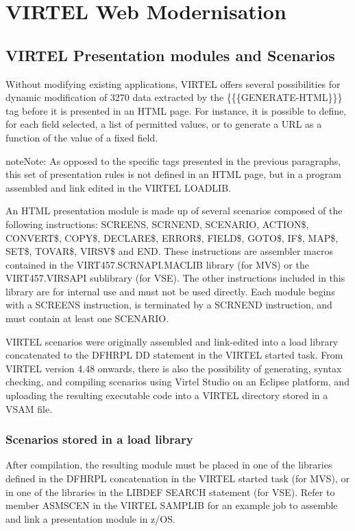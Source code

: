 \documentclass[letterpaper,10pt,english]{sphinxmanual}
\begin{document}
\section{VIRTEL Web Modernisation}
\label{\detokenize{User_Guide:v457ug-virtel-scenarios}}\label{\detokenize{User_Guide:virtel-web-modernisation}}

\subsection{VIRTEL Presentation modules and Scenarios}
\label{\detokenize{User_Guide:virtel-presentation-modules-and-scenarios}}
Without modifying existing applications, VIRTEL offers several possibilities for dynamic modification of 3270 data
extracted by the \{\{\{GENERATE-HTML\}\}\} tag before it is presented in an HTML page. For instance, it is possible to define,
for each field selected, a list of permitted values, or to generate a URL as a function of the value of a fixed field.

\begin{sphinxadmonition}{note}{Note:}
As opposed to the specific tags presented in the previous paragraphs, this set of presentation rules is not defined in an HTML page, but in a program assembled and link edited in the VIRTEL LOADLIB.
\end{sphinxadmonition}

An HTML presentation module is made up of several scenarios composed of the following instructions: SCREENS, SCRNEND, SCENARIO, ACTION\$, CONVERT\$, COPY\$, DECLARE\$, ERROR\$, FIELD\$, GOTO\$, IF\$, MAP\$, SET\$, TOVAR\$, VIRSV\$ and END. These instructions are assembler macros contained in the VIRT457.SCRNAPI.MACLIB library (for MVS) or the VIRT457.VIRSAPI sublibrary (for VSE). The other instructions included in this library are for internal use and must not be used directly. Each module begins with a SCREENS instruction, is terminated by a SCRNEND instruction, and
must contain at least one SCENARIO.

VIRTEL scenarios were originally assembled and link-edited into a load library concatenated to the DFHRPL DD
statement in the VIRTEL started task. From VIRTEL version 4.48 onwards, there is also the possibility of generating,
syntax checking, and compiling scenarios using Virtel Studio on an Eclipse platform, and uploading the resulting
executable code into a VIRTEL directory stored in a VSAM file.


\subsubsection{Scenarios stored in a load library}
\label{\detokenize{User_Guide:scenarios-stored-in-a-load-library}}
After compilation, the resulting module must be placed in one of the libraries defined in the DFHRPL concatenation in
the VIRTEL started task (for MVS), or in one of the libraries in the LIBDEF SEARCH statement (for VSE). Refer to member
ASMSCEN in the VIRTEL SAMPLIB for an example job to assemble and link a presentation module in z/OS.
\end{document}
